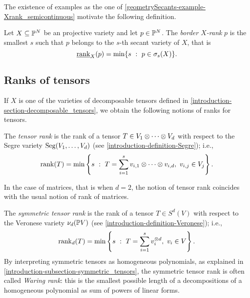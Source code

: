  The existence of examples as the one of \ref{geometrySecants-example-Xrank_semicontinuous} motivate the following definition.
 \begin{definition}
     \label{geometrySecants-definition-border_rank}
     Let $X \subseteq \mathbb{P}^N$ be an projective variety and let $p \in \mathbb{P}^N$. The \emph{border $X$-rank} $p$ is the smallest $s$ such that $p$ belongs to the $s$-th secant variety of $X$, that is 
     \[
         \underline{\mathrm{rank}}_X(p) = \min\{s ~:~ p \in \sigma_s(X)\}.
     \]
 \end{definition}
 
 
 \subsection{Ranks of tensors}
 If $X$ is one of the varieties of decomposable tensors defined in \ref{introduction-section-decomposable_tensors}, we obtain the following notions of ranks for tensors.
 
 \begin{definition}
 \label{geometrySecants-definition-tensor_rank}
     The \emph{tensor rank} is the rank of a tensor $T \in V_1 \otimes \cdots \otimes V_d$ with respect to the Segre variety $\mathrm{Seg}(V_1,\ldots,V_d)$ (see \ref{introduction-definition-Segre}); i.e., 
     \[
         \mathrm{rank}(T) = \min\left\{s ~:~ T = \sum_{i=1}^s v_{i,1}\otimes \cdots \otimes v_{i,d}, ~ v_{i,j} \in V_j\right\}.
     \]
     \begin{example}
         In the case of matrices, that is when $d=2$, the notion of tensor rank coincides with the usual notion of rank of matrices.
     \end{example}
 \end{definition}
 
 \begin{definition}
 \label{geometrySecants-definition-symmetric_tensor_rank}
     The \emph{symmetric tensor rank} is the rank of a tensor $T \in S^d(V)$ with respect to the Veronese variety $\nu_d(\mathbb{P} V)$ (see \ref{introduction-definition-Veronese}); i.e., 
     \[
         \mathrm{rank}_d(T) = \min\left\{s ~:~ T = \sum_{i=1}^s v_{i}^{\otimes d}, ~ v_{i} \in V\right\}.
     \]
     By interpreting symmetric tensors as homogeneous polynomials, as explained in \ref{introduction-subsection-symmetric_tensors}, the symmetric tensor rank is often called \emph{Waring rank}: this is the smallest possible length of a decompositions of a homogeneous polynomial as sum of powers of linear forms.
 \end{definition}  
 
